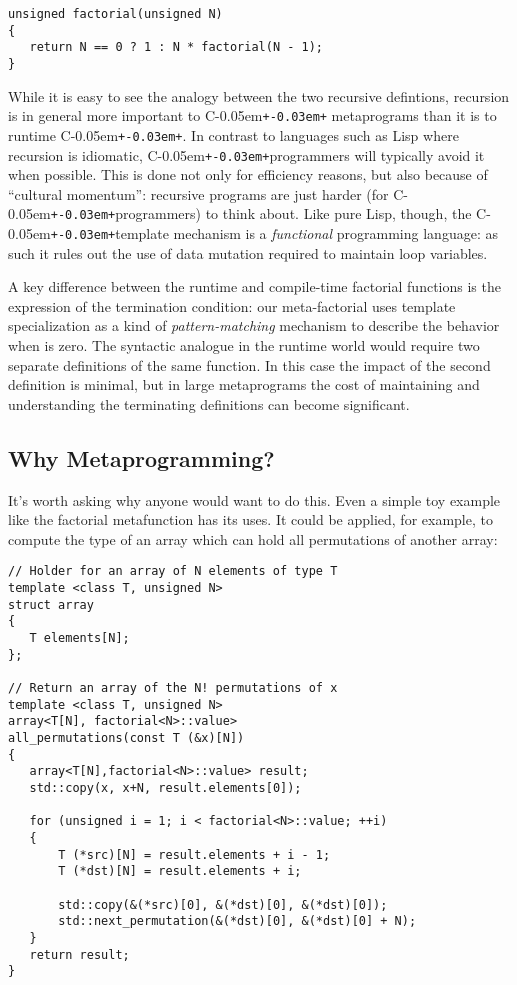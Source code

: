 \documentclass{netobjectdays}
\newcommand{\Cpp}{C\kern-0.05em\texttt{+\kern-0.03em+}}
\begin{document}
{\footnotesize
\begin{verbatim}
unsigned factorial(unsigned N)
{
   return N == 0 ? 1 : N * factorial(N - 1);
}
\end{verbatim}
}

While it is easy to see the analogy between the two recursive
defintions, recursion is in general more important to \Cpp
metaprograms than it is to runtime \Cpp. In contrast to languages such
as Lisp where recursion is idiomatic, \Cpp programmers will typically
avoid it when possible. This is done not only for efficiency
reasons, but also because of ``cultural momentum'': recursive programs
are just harder (for \Cpp programmers) to think about. Like pure Lisp,
though, the \Cpp template mechanism is a \emph{functional} programming
language: as such it rules out the use of data mutation required to
maintain loop variables.

A key difference between the runtime and compile-time factorial
functions is the expression of the termination condition: our
meta-factorial uses template specialization as a kind of
\emph{pattern-matching} mechanism to describe the behavior when
 is zero. The syntactic analogue in the runtime world would
require two separate definitions of the same function. In this case
the impact of the second definition is minimal, but in large
metaprograms the cost of maintaining and understanding the terminating
definitions can become significant.

\subsection{Why Metaprogramming?}

It's worth asking why anyone would want to do this. Even a simple toy
example like the factorial metafunction has its uses. It could be
applied, for example, to compute the type of an array which can hold
all permutations of another array:

{\footnotesize
\begin{verbatim}
// Holder for an array of N elements of type T
template <class T, unsigned N>
struct array
{
   T elements[N];
};

// Return an array of the N! permutations of x
template <class T, unsigned N>
array<T[N], factorial<N>::value>
all_permutations(const T (&x)[N])
{
   array<T[N],factorial<N>::value> result;
   std::copy(x, x+N, result.elements[0]);

   for (unsigned i = 1; i < factorial<N>::value; ++i)
   {
       T (*src)[N] = result.elements + i - 1;
       T (*dst)[N] = result.elements + i;
       
       std::copy(&(*src)[0], &(*dst)[0], &(*dst)[0]);
       std::next_permutation(&(*dst)[0], &(*dst)[0] + N);
   }
   return result;
}
\end{verbatim}
}
\end{document}
